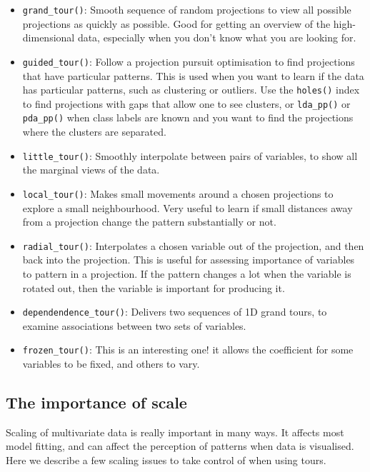 \documentclass[
  letterpaper,
]{book}
\providecommand{\tightlist}{%
  \setlength{\itemsep}{0pt}\setlength{\parskip}{0pt}}\usepackage{longtable,booktabs,array}
\begin{document}
\begin{itemize}
\tightlist
\item
  \texttt{grand\_tour()}: Smooth sequence of random projections to view
  all possible projections as quickly as possible. Good for getting an
  overview of the high-dimensional data, especially when you don't know
  what you are looking for.
\item
  \texttt{guided\_tour()}: Follow a projection pursuit optimisation to
  find projections that have particular patterns. This is used when you
  want to learn if the data has particular patterns, such as clustering
  or outliers. Use the \texttt{holes()} index to find projections with
  gaps that allow one to see clusters, or \texttt{lda\_pp()} or
  \texttt{pda\_pp()} when class labels are known and you want to find
  the projections where the clusters are separated.
\item
  \texttt{little\_tour()}: Smoothly interpolate between pairs of
  variables, to show all the marginal views of the data.
\item
  \texttt{local\_tour()}: Makes small movements around a chosen
  projections to explore a small neighbourhood. Very useful to learn if
  small distances away from a projection change the pattern
  substantially or not.
\item
  \texttt{radial\_tour()}: Interpolates a chosen variable out of the
  projection, and then back into the projection. This is useful for
  assessing importance of variables to pattern in a projection. If the
  pattern changes a lot when the variable is rotated out, then the
  variable is important for producing it.
\item
  \texttt{dependendence\_tour()}: Delivers two sequences of 1D grand
  tours, to examine associations between two sets of variables.
\item
  \texttt{frozen\_tour()}: This is an interesting one! it allows the
  coefficient for some variables to be fixed, and others to vary.
\end{itemize}

\hypertarget{the-importance-of-scale}{%
\subsection{The importance of scale}\label{the-importance-of-scale}}

Scaling of multivariate data is really important in many ways. It
affects most model fitting, and can affect the perception of patterns
when data is visualised. Here we describe a few scaling issues to take
control of when using tours.
\end{document}

